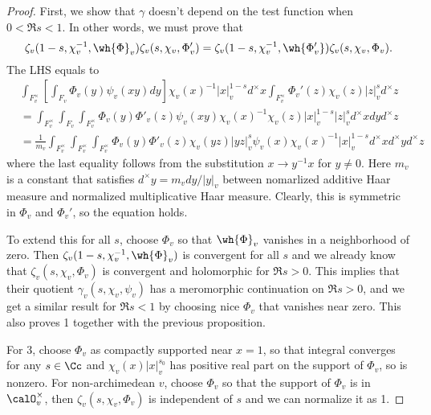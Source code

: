 \documentclass{article}
\begin{document}
\begin{proof}
First, we show that $\gamma$ doesn't depend on the test function when $0<\Re s < 1$. In other words, we must prove that 
$$
\zeta_{v}(1-s, \chi_{v}^{-1}, \wh{\Phi}_{v}) \zeta_{v}(s, \chi_{v}, \Phi_{v}') = \zeta_{v}(1-s, \chi_{v}^{-1}, \wh{\Phi_{v}'}) \zeta_{v}(s, \chi_{v}, \Phi_{v}).
$$
The LHS equals to 
\begin{align*}
&\int_{F_{v}^{\times}}\left[ \int_{F_{v}} \Phi_{v}(y) \psi_v(xy)dy\right]\chi_{v}(x)^{-1}|x|_{v}^{1-s} d^{\times}x \int_{F_{v}^{\times}} \Phi_{v}'(z)\chi_{v}(z) |z|_{v}^{s} d^{\times}z \\
&= \int_{F_{v}^{\times}}\int_{F_{v}}\int_{F_{v}^{\times}} \Phi_{v}(y)\Phi'_{v}(z)\psi_v(xy)\chi_{v}(x)^{-1}\chi_{v}(z) |x|_{v}^{1-s}|z|_{v}^{s} d^{\times}x dyd^{\times}z \\
&= \frac{1}{m_{v}} \int_{F_{v}^{\times}}\int_{F_{v}^{\times}}\int_{F_{v}^{\times}} \Phi_{v}(y)\Phi'_{v}(z) \chi_{v}(yz) |yz|_{v}^{s} \psi_v(x) \chi_{v}(x)^{-1} |x|_{v}^{1-s}d^{\times}x d^{\times}y d^{\times} z
\end{align*}
where the last equality follows from the substitution $x\to y^{-1}x$ for $y\neq 0$. Here $m_{v}$ is a constant that satisfies $d^{\times}y = m_{v}dy / |y|_{v}$ between nomarlized additive Haar measure and normalized multiplicative Haar measure.  Clearly, this is symmetric in $\Phi_{v}$ and $\Phi_{v}'$, so the equation holds. 

To extend this for all $s$, choose $\Phi_{v}$ so that $\wh{\Phi}_{v}$  vanishes in a neighborhood of zero. Then $\zeta_{v}(1-s,\chi_{v}^{-1}, \wh{\Phi}_{v})$ is convergent for all $s$ and we already know that $\zeta_{v}(s, \chi_{v}, \Phi_{v})$ is convergent and holomorphic for $\Re s >0$. 
This implies that their quotient $\gamma_{v}(s, \chi_{v}, \psi_{v})$ has a meromorphic continuation on $\Re s> 0$, and we get a similar result for $\Re s <1$ by choosing nice $\Phi_{v}$ that vanishes near zero. This also proves 1 together with the previous proposition. 

For 3, choose $\Phi_{v}$ as compactly supported near $x = 1$, so that integral converges for any $s\in \Cc$ and $\chi_{v}(x) |x|^{s_{0}}_{v}$ has positive real part on the support of $\Phi_{v}$, so is nonzero. For non-archimedean $v$, choose $\Phi_{v}$ so that the support of $\Phi_{v}$ is in $\calO_{v}^{\times}$, then $\zeta_{v}(s, \chi_{v}, \Phi_{v})$ is independent of $s$ and we can normalize it as 1. 
\end{proof}
\end{document}
